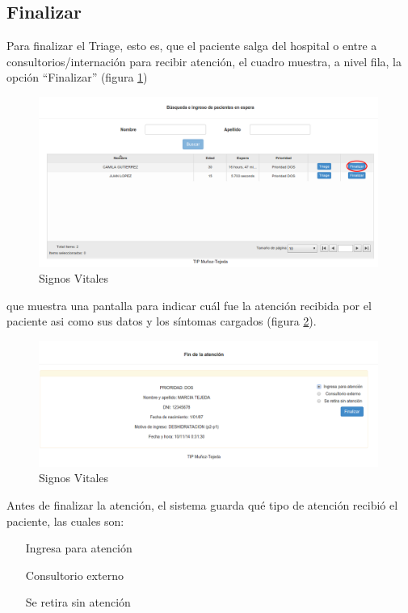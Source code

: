\subsection{Finalizar}
Para finalizar el Triage, esto es, que el paciente salga del hospital o entre a consultorios/internación para recibir atención, el cuadro muestra, a nivel fila, la opción ``Finalizar'' (figura \ref{fig:espera2})
\begin{figure}
\centerline{\includegraphics[width=0.99\textwidth]{espera2.png}}
\caption{Signos Vitales} \label{fig:espera2}
\end{figure}
que muestra una pantalla para indicar cuál fue la atención recibida por el paciente asi como sus datos y los síntomas cargados (figura \ref{fig:fin_atencion}).
\begin{figure}
\centerline{\includegraphics[width=0.99\textwidth]{fin_atencion.png}}
\caption{Signos Vitales} \label{fig:fin_atencion}
\end{figure}

Antes de finalizar la atención, el sistema guarda qué tipo de atención recibió el paciente, las cuales son:

\begin{itemize}
\item[Ingresa para atención]
\item[Consultorio externo]
\item[Se retira sin atención]
\end{itemize}